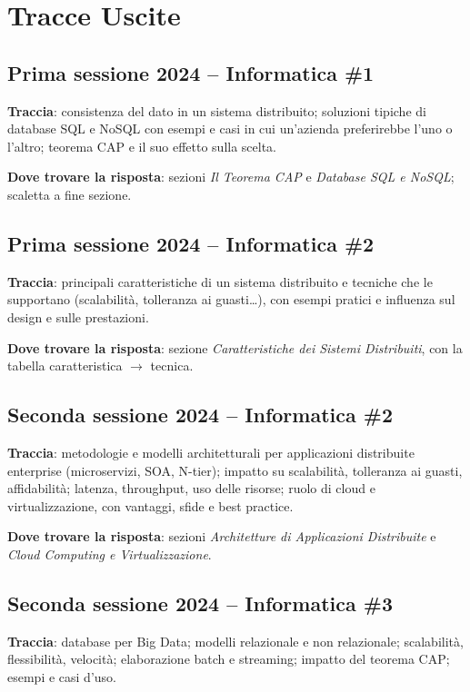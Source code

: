 
\section*{Tracce Uscite} %

\subsection*{Prima sessione 2024 -- Informatica \#1}
\textbf{Traccia}: consistenza del dato in un sistema distribuito; soluzioni tipiche di database SQL e NoSQL con esempi e casi in cui un'azienda preferirebbe l'uno o l'altro; teorema CAP e il suo effetto sulla scelta.

\textbf{Dove trovare la risposta}: sezioni \emph{Il Teorema CAP} e \emph{Database SQL e NoSQL}; scaletta a fine sezione.

\subsection*{Prima sessione 2024 -- Informatica \#2}
\textbf{Traccia}: principali caratteristiche di un sistema distribuito e tecniche che le supportano (scalabilità, tolleranza ai guasti\ldots), con esempi pratici e influenza sul design e sulle prestazioni.

\textbf{Dove trovare la risposta}: sezione \emph{Caratteristiche dei Sistemi Distribuiti}, con la tabella caratteristica $\to$ tecnica.

\subsection*{Seconda sessione 2024 -- Informatica \#2}
\textbf{Traccia}: metodologie e modelli architetturali per applicazioni distribuite enterprise (microservizi, SOA, N-tier); impatto su scalabilità, tolleranza ai guasti, affidabilità; latenza, throughput, uso delle risorse; ruolo di cloud e virtualizzazione, con vantaggi, sfide e best practice.

\textbf{Dove trovare la risposta}: sezioni \emph{Architetture di Applicazioni Distribuite} e \emph{Cloud Computing e Virtualizzazione}.

\subsection*{Seconda sessione 2024 -- Informatica \#3}
\textbf{Traccia}: database per Big Data; modelli relazionale e non relazionale; scalabilità, flessibilità, velocità; elaborazione batch e streaming; impatto del teorema CAP; esempi e casi d'uso.

